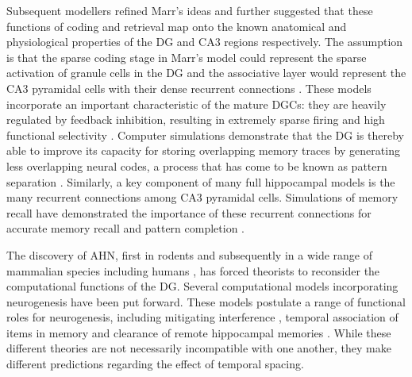 Subsequent modellers refined Marr's ideas and 
further suggested that these functions of coding and retrieval map onto the
known anatomical and physiological properties of the 
\ac{DG} and CA3 regions respectively. 
The assumption is that the sparse coding stage in Marr's model could represent 
the sparse activation of granule cells in the \ac{DG} and the 
associative layer would represent the 
CA3 pyramidal cells with their dense recurrent connections 
\citep{mcnaughton-morris-87,treves-rolls-92,oreilly_hippocampal_encoding_storage_and_recall,mcclelland-mcnaughton-oreilly-95,myers-scharfman-09}.
These models incorporate an important characteristic of the
mature \acp{DGC}: they are heavily regulated by feedback
inhibition, resulting in extremely sparse firing 
and high functional selectivity \citep{jung-mcnaughton-93,chawla-et-al-05}. 
Computer simulations demonstrate that the \ac{DG} is thereby able to improve its capacity for
storing overlapping memory traces by generating less overlapping
neural codes, a process that has come to be known as pattern separation
\citep{rolls-1987, oreilly_hippocampal_encoding_storage_and_recall, rolls-treves-1998}.
Similarly, a key component of many full hippocampal models is the many 
recurrent connections among CA3 pyramidal cells. 
Simulations of memory recall have demonstrated the importance of 
these recurrent connections for accurate memory recall and pattern completion 
\citep{mcnaughton-morris-87,treves-rolls-92,oreilly_hippocampal_encoding_storage_and_recall}.

The discovery of \ac{AHN}, first in rodents \citep{origin_of_microneurons,altman-das-67} 
and subsequently in a wide range of mammalian species 
including humans \citep{eriksson-et-al-98}, has forced theorists to reconsider
the computational functions of the \ac{DG}.
Several computational models
incorporating neurogenesis have been put forward. 
These models postulate a
range of functional roles for neurogenesis, including mitigating
interference 
\citep{chambers-potenza-hoffman-miranker-04,replacement_neurogenesis,wiskott-rasch-kempermann-06,becker-macqueen-wojtowicz-09,cuneo-quiroz-weisz-argibay-2012},
temporal association of items in
memory \citep{aimone-wiles-gage-06,aimone-wiles-gage-09} and 
clearance of remote hippocampal
memories \citep{chambers-potenza-hoffman-miranker-04,deisseroth-singla-toda-monje-palmer-malenka-04,additive_neurogenesis,weisz-argibay-2012}.
While these different theories are not necessarily incompatible with one
another, they make different predictions regarding the effect of temporal
spacing. 

